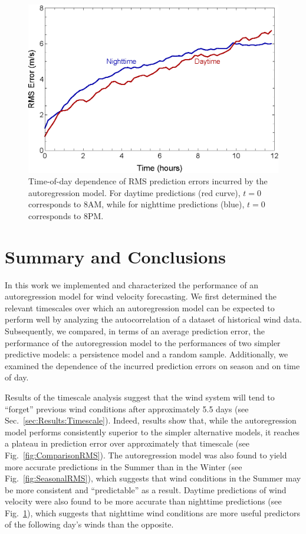 \documentclass[11pt, oneside]{article}
\newcommand{\figref}[1]{Fig.~\ref{#1}}
\newcommand{\secref}[1]{Sec.~\ref{#1}}
\begin{document}
\begin{figure}[htb]
\centering
\includegraphics[width=0.7\columnwidth]{figures/DiurnalRMSPredictionError}
\caption{Time-of-day dependence of RMS prediction errors incurred by the autoregression model.
For daytime predictions (red curve), $t = 0$ corresponds to 8AM, while for nighttime predictions (blue), $t = 0$ corresponds to 8PM.}
\label{fig:DiurnalRMS}
\end{figure}

\section{Summary and Conclusions}\label{sec:Conclusions}
In this work we implemented and characterized the performance of an autoregression model for wind velocity forecasting.
We first determined the relevant timescales over which an autoregression model can be expected to perform well by analyzing the autocorrelation of a dataset of historical wind data.
Subsequently, we compared, in terms of an average prediction error, the performance of the autoregression model to the performances of two simpler predictive models: a persistence model and a random sample.
Additionally, we examined the dependence of the incurred prediction errors on season and on time of day.

Results of the timescale analysis suggest that the wind system will tend to ``forget'' previous wind conditions after approximately 5.5 days (see \secref{sec:Results:Timescale}).
Indeed, results show that, while the autoregression model performs consistently superior to the simpler alternative models, it reaches a plateau in prediction error over approximately that timescale (see \figref{fig:ComparisonRMS}).
The autoregression model was also found to yield more accurate predictions in the Summer than in the Winter (see \figref{fig:SeasonalRMS}), which suggests that wind conditions in the Summer may be more consistent and ``predictable'' as a result.
Daytime predictions of wind velocity were also found to be more accurate than nighttime predictions (see \figref{fig:DiurnalRMS}), which suggests that nighttime wind conditions are more useful predictors of the following day's winds than the opposite.
\end{document}
